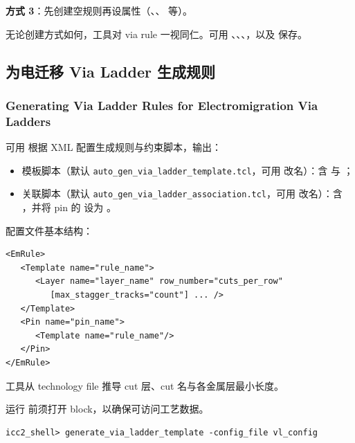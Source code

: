 \textbf{方式 3}：先创建空规则再设属性（、、 等）。

无论创建方式如何，工具对 via rule 一视同仁。可用 、、、，以及  保存。

\subsection{为电迁移 Via Ladder 生成规则}
\subsubsection*{Generating Via Ladder Rules for Electromigration Via Ladders}

可用  根据 XML 配置生成规则与约束脚本，输出：
\begin{itemize}
  \item 模板脚本（默认 \texttt{auto\_gen\_via\_ladder\_template.tcl}，可用  改名）：含  与 ；
  \item 关联脚本（默认 \texttt{auto\_gen\_via\_ladder\_association.tcl}，可用  改名）：含 ，并将 pin 的  设为 。
\end{itemize}

配置文件基本结构：
\begin{lstlisting}
<EmRule>
   <Template name="rule_name">
      <Layer name="layer_name" row_number="cuts_per_row"
         [max_stagger_tracks="count"] ... />
   </Template>
   <Pin name="pin_name">
      <Template name="rule_name"/>
   </Pin>
</EmRule>
\end{lstlisting}

工具从 technology file 推导 cut 层、cut 名与各金属层最小长度。

\begin{noteBox}
运行  前须打开 block，以确保可访问工艺数据。
\end{noteBox}

\begin{lstlisting}
icc2_shell> generate_via_ladder_template -config_file vl_config
\end{lstlisting}

